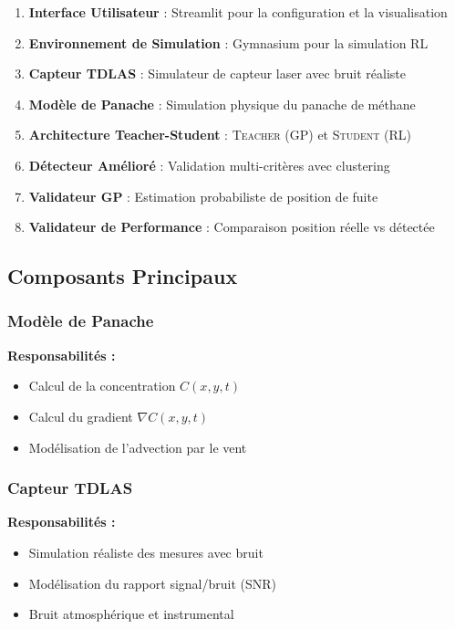 \documentclass[12pt,a4paper]{article}
\newcommand{\teacher}{\textsc{Teacher}}
\newcommand{\student}{\textsc{Student}}
\newcommand{\gp}{\textsc{GP}}
\newcommand{\rl}{\textsc{RL}}
\begin{document}
\begin{enumerate}
    \item \textbf{Interface Utilisateur} : Streamlit pour la configuration et la visualisation
    \item \textbf{Environnement de Simulation} : Gymnasium pour la simulation \rl{}
    \item \textbf{Capteur TDLAS} : Simulateur de capteur laser avec bruit réaliste
    \item \textbf{Modèle de Panache} : Simulation physique du panache de méthane
    \item \textbf{Architecture Teacher-Student} : \teacher{} (\gp{}) et \student{} (\rl{})
    \item \textbf{Détecteur Amélioré} : Validation multi-critères avec clustering
    \item \textbf{Validateur \gp{}} : Estimation probabiliste de position de fuite
    \item \textbf{Validateur de Performance} : Comparaison position réelle vs détectée
\end{enumerate}

\subsection{Composants Principaux}

\subsubsection{Modèle de Panache}

\textbf{Responsabilités :}
\begin{itemize}
    \item Calcul de la concentration $C(x, y, t)$
    \item Calcul du gradient $\nabla C(x, y, t)$
    \item Modélisation de l'advection par le vent
\end{itemize}

\subsubsection{Capteur TDLAS}

\textbf{Responsabilités :}
\begin{itemize}
    \item Simulation réaliste des mesures avec bruit
    \item Modélisation du rapport signal/bruit (SNR)
    \item Bruit atmosphérique et instrumental
\end{itemize}
\end{document}
